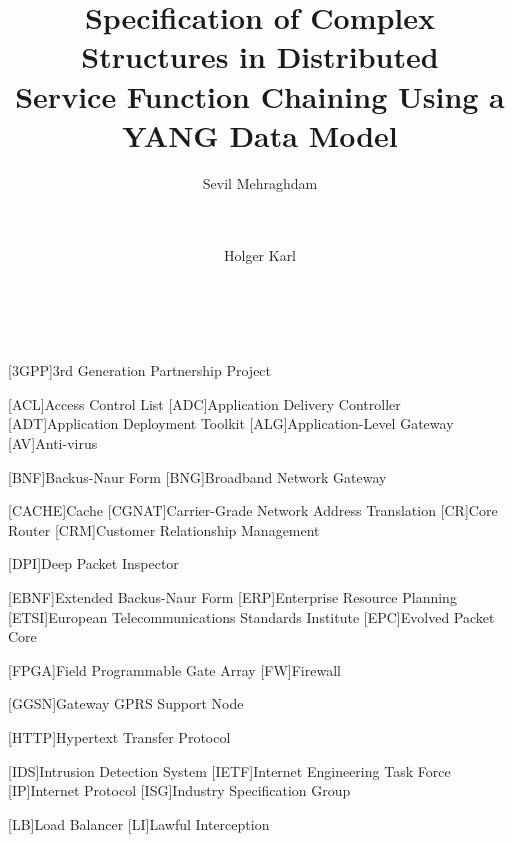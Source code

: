 \documentclass{sig-alternate-per}
\begin{document}
\title{Specification of Complex Structures in Distributed \\ Service Function 
Chaining Using a YANG Data Model}

 \author{
\alignauthor
Sevil Mehraghdam\\
       \\
       \\
\and
\alignauthor
Holger Karl\\
       \\
       \\
}


\begin{acronym}[WWWW]

[3GPP]{3rd Generation Partnership Project}

[ACL]{Access Control List}
[ADC]{Application Delivery Controller}
[ADT]{Application Deployment Toolkit}
[ALG]{Application-Level Gateway}
[AV]{Anti-virus}

[BNF]{Backus-Naur Form}
[BNG]{Broadband Network Gateway}



[CACHE]{Cache}
[CGNAT]{Carrier-Grade Network Address Translation}
[CR]{Core Router}
[CRM]{Customer Relationship Management}

[DPI]{Deep Packet Inspector}


[EBNF]{Extended Backus-Naur Form}
[ERP]{Enterprise Resource Planning}
[ETSI]{European Telecommunications Standards Institute}
[EPC]{Evolved Packet Core}

[FPGA]{Field Programmable Gate Array}
[FW]{Firewall}


[GGSN]{Gateway GPRS Support Node}

[HTTP]{Hypertext Transfer Protocol }

[IDS]{Intrusion Detection System}
[IETF]{Internet Engineering Task Force}
[IP]{Internet Protocol}
[ISG]{Industry Specification Group}







[LB]{Load Balancer}
[LI]{Lawful Interception}





\end{acronym}
\end{document}
